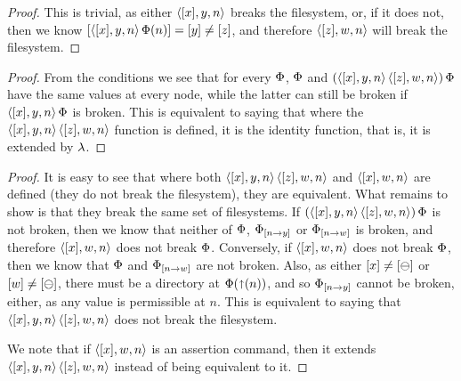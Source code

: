\begin{myaxproof}
\axaxsamebreaks
\end{myaxproof}

\begin{proof}
This is trivial, as either $\langle{[x],y,n}\rangle$ breaks the filesystem, or, if it does not, then
we know $[\langle{[x],y,n}\rangle\,\Phi(n)]=[y]\neq [z]$, and therefore $\langle{[z],w,n}\rangle$ will break the filesystem.
\end{proof}

\begin{myaxproof}
\axaxsameemptyseq
\end{myaxproof}

\begin{proof}
From the conditions we see that for every $\Phi$,
$\Phi$ and $(\langle{[x],y,n}\rangle\,\langle{[z],w,n}\rangle)\,\Phi$ have the same values at every node,
while the latter can still be broken if $\langle{[x],y,n}\rangle\,\Phi$ is broken.
This is equivalent to saying that where the $\langle{[x],y,n}\rangle\,\langle{[z],w,n}\rangle$ function is defined,
it is the identity function, that is, it is extended by $\lambda$.
\end{proof}

\begin{myaxproof}
\axaxsamesinglec
\end{myaxproof}

\begin{proof}
It is easy to see that where both $\langle{[x],y,n}\rangle\, \langle{[z],w,n}\rangle$ and $\langle{[x],w,n}\rangle$ are defined
(they do not break the filesystem), they are equivalent.
What remains to show is that they break the same set of filesystems.
If $(\langle{[x],y,n}\rangle\, \langle{[z],w,n}\rangle)\,\Phi$ is not broken, then we know that neither of
$\Phi$, ${\Phi}_{[{n}\rightarrow{y}]}$ or ${\Phi}_{[{n}\rightarrow{w}]}$ is broken,
and therefore $\langle{[x],w,n}\rangle$ does not break $\Phi$.
Conversely, if $\langle{[x],w,n}\rangle$ does not break $\Phi$, then 
we know that $\Phi$ and ${\Phi}_{[{n}\rightarrow{w}]}$ are not broken.
Also, as
either $[x]\neq[\ominus]$ or $[w]\neq[\ominus]$,
there must be a directory at $\Phi(\mathord{\shortuparrow}({n}))$,
and so ${\Phi}_{[{n}\rightarrow{y}]}$ cannot be broken, either,
as any value is permissible at $n$.
This is equivalent to saying that $\langle{[x],y,n}\rangle\, \langle{[z],w,n}\rangle$ does not break the filesystem.

We note that if $\langle{[x],w,n}\rangle$ is an assertion command, then it extends $\langle{[x],y,n}\rangle\,\langle{[z],w,n}\rangle$
instead of being equivalent to it.
\end{proof}

\begin{myaxproof}
\axaxdirectchildbreaks
\end{myaxproof}

